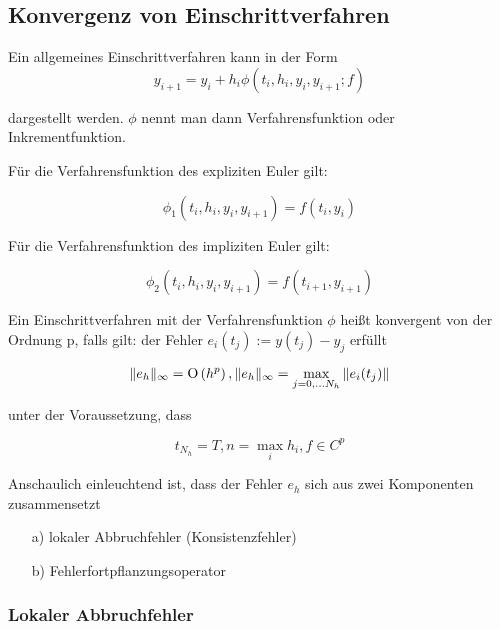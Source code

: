 \subsection{Konvergenz von Einschrittverfahren}

Ein allgemeines Einschrittverfahren kann in der Form 
$$y_{i+1} = y_i + h_i \phi (t_i, h_i, y_i, y_{i+1}; f)$$

dargestellt werden. $\phi$ nennt man dann Verfahrensfunktion oder Inkrementfunktion. 

\begin{example} Für die Verfahrensfunktion des expliziten Euler gilt:

	$$\phi_1(t_i, h_i, y_i, y_{i+1}) = f(t_i, y_i)$$
	
	Für die Verfahrensfunktion des impliziten Euler gilt:
	
	$$\phi_2(t_i, h_i, y_i, y_{i+1}) = f(t_{i+1}, y_{i+1})$$

\end{example}


\begin{definition}[Definition IV.3] 
	Ein Einschrittverfahren mit der Verfahrensfunktion $\phi$ heißt konvergent von der Ordnung p, falls gilt: der Fehler $e_i(t_j) := y(t_j) - y_j$ erfüllt 
	
	$$\|e_h\|_\infty = \operatorname{O}\left(h^p\right), \|e_h\|_\infty = \displaystyle\max_{j=0, \dots N_h}\|e_i(t_j)\|$$
	
	unter der Voraussetzung, dass 
	
	$$t_{N_h} = T, n = \max_i h_i, f \in C^p$$
\end{definition}

\begin{remark}
	Anschaulich einleuchtend ist, dass der Fehler $e_h$ sich aus zwei Komponenten zusammensetzt
	
	\begin{enumerate}
		\item[a)] lokaler Abbruchfehler (Konsistenzfehler)
		\item[b)] Fehlerfortpflanzungsoperator
	\end{enumerate}
\end{remark}

\subsubsection{Lokaler Abbruchfehler}

